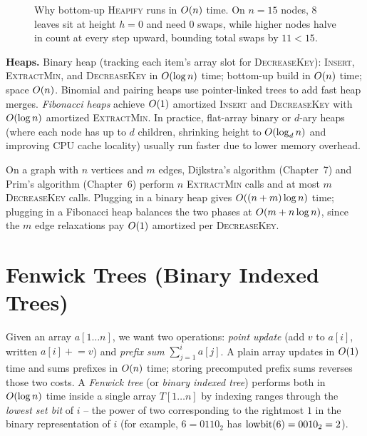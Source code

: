 \begin{figure}[htbp]
\caption{Why bottom-up \textsc{Heapify} runs in $O(n)$ time. On $n=15$ nodes, $8$ leaves sit at height $h=0$ and need $0$ swaps, while higher nodes halve in count at every step upward, bounding total swaps by $11 < 15$.}
\label{ch42:fig-heap-sift}
\end{figure}

\begin{complexitybox}
\textbf{Heaps.} Binary heap (tracking each item's array slot for \textsc{DecreaseKey}): \textsc{Insert}, \textsc{ExtractMin}, and \textsc{DecreaseKey} in $O(\log n)$ time; bottom-up build in $O(n)$ time; space $O(n)$. Binomial and pairing heaps use pointer-linked trees to add fast heap merges. \emph{Fibonacci heaps} achieve $O(1)$ amortized \textsc{Insert} and \textsc{DecreaseKey} with $O(\log n)$ amortized \textsc{ExtractMin}. In practice, flat-array binary or $d$-ary heaps (where each node has up to $d$ children, shrinking height to $O(\log_d n)$ and improving CPU cache locality) usually run faster due to lower memory overhead.
\end{complexitybox}

\begin{connectionbox}
On a graph with $n$ vertices and $m$ edges, Dijkstra's algorithm (Chapter~7) and Prim's algorithm (Chapter~6) perform $n$ \textsc{ExtractMin} calls and at most $m$ \textsc{DecreaseKey} calls. Plugging in a binary heap gives $O((n + m)\log n)$ time; plugging in a Fibonacci heap balances the two phases at $O(m + n\log n)$, since the $m$ edge relaxations pay $O(1)$ amortized per \textsc{DecreaseKey}.
\end{connectionbox}

\section{Fenwick Trees (Binary Indexed Trees)}
\label{ch42:fenwick}

Given an array $a[1\dots n]$, we want two operations: \emph{point update} (add $v$ to $a[i]$, written $a[i] \mathrel{+}= v$) and \emph{prefix sum} $\sum_{j=1}^i a[j]$. A plain array updates in $O(1)$ time and sums prefixes in $O(n)$ time; storing precomputed prefix sums reverses those two costs. A \emph{Fenwick tree} (or \emph{binary indexed tree}) performs both in $O(\log n)$ time inside a single array $T[1\dots n]$ by indexing ranges through the \emph{lowest set bit} of $i$ -- the power of two corresponding to the rightmost $1$ in the binary representation of $i$ (for example, $6 = 0110_2$ has $\operatorname{lowbit}(6) = 0010_2 = 2$).

